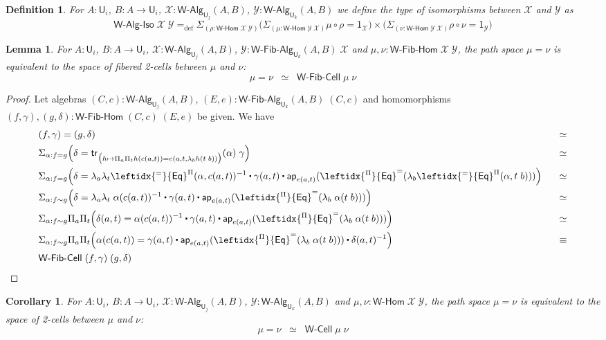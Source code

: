 \documentclass[reqno,10pt,a4paper,oneside]{amsart}
\newcommand{\X}{\mathcal{X}}
\newcommand{\Y}{\mathcal{Y}}
\newcommand{\comp}{\circ}
\newcommand{\prd}[1]{\Pi_{#1}}
\newcommand{\sm}[1]{\Sigma_{#1}}
\newcommand{\lam}[1]{\lambda_{#1}}
\newcommand{\defeq}{=_{\mathrm{def}}}
\newcommand{\funext}{\leftidx{^\Pi}{\mathsf{Eq}}^{=}}
\newcommand{\happly}{\leftidx{^=}{\mathsf{Eq}}^{\Pi}}
\newcommand{\one}{\mathsf{1}}
\newcommand{\UU}{\mathsf{U}}
\newcommand{\WCell}{\mathsf{W}\text{-}\mathsf{Cell}}
\newcommand{\WFibCell}{\mathsf{W}\text{-}\mathsf{Fib}\text{-}\mathsf{Cell}}
\newcommand{\WAlg}{\mathsf{W}\text{-}\mathsf{Alg}}
\newcommand{\WFibAlg}{\mathsf{W}\text{-}\mathsf{Fib}\text{-}\mathsf{Alg}}
\newcommand{\WHom}{\mathsf{W}\text{-}\mathsf{Hom}}
\newcommand{\WFibHom}{\mathsf{W}\text{-}\mathsf{Fib}\text{-}\mathsf{Hom}}
\newcommand{\app}{\mathsf{ap}}
\newcommand{\trans}{\mathsf{tr}}
\newcommand{\WAlgIso}{\mathsf{W}\text{-}\mathsf{Alg}\text{-}\mathsf{Iso}}
\newcommand{\ct}{%
  \mathchoice{\mathbin{\raisebox{0.5ex}{$\displaystyle\centerdot$}}}%
             {\mathbin{\raisebox{0.5ex}{$\centerdot$}}}%
             {\mathbin{\raisebox{0.25ex}{$\scriptstyle\,\centerdot\,$}}}%
             {\mathbin{\raisebox{0.1ex}{$\scriptscriptstyle\,\centerdot\,$}}}}
\numberwithin{equation}{section}
\theoremstyle{mythm}
\newtheorem{lemma}[theorem]{Lemma}
\newtheorem{corollary}[theorem]{Corollary}
\theoremstyle{mydef}
\newtheorem{definition}[theorem]{Definition}
\theoremstyle{myrmk}
\begin{document}
\begin{definition}
For $A:\UU_i$, $B : A \to \UU_i$, $\X : \WAlg_{\UU_j}(A,B)$, $\Y : \WAlg_{\UU_k}(A,B)$ we define the type of \emph{isomorphisms} between $\X$ and $\Y$ as
\[\WAlgIso \; \X \; \Y \defeq \sm{(\rho : \WHom \; \X \; \Y)} \Big(\sm{(\mu : \WHom \; \Y \; \X)} \mu \comp \rho = \one_\X \Big) \times \Big(\sm{(\nu : \WHom \; \Y \; \X)} \rho \comp \nu = \one_\Y \Big) \] 
\end{definition}

\begin{lemma}\label{WFibHomSpace}
For $A:\UU_i$, $B : A \to \UU_i$, $\X : \WAlg_{\UU_j}(A,B)$, $\Y : \WFibAlg_{\UU_k}(A,B) \; \X$ and $\mu,\nu : \WFibHom \; \X \; \Y$, the path space $\mu = \nu$ is equivalent to the space of fibered 2-cells between $\mu$ and $\nu$:
\[ \mu = \nu \;\; \simeq \;\; \WFibCell \; \mu \; \nu \] 
\end{lemma}
\begin{proof}
Let algebras $(C,c) : \WAlg_{\UU_j}(A,B)$, $(E,e) : \WFibAlg_{\UU_k}(A,B) \; (C,c)$ and homomorphisms $(f,\gamma), (g,\delta) : \WFibHom \; (C,c) \; (E,e)$ be given. We have
\begin{alignat*}{4}
& (f,\gamma) = (g,\delta) & \simeq \\
& \sm{\alpha : f = g} \Big(\delta = \trans_{\big(h \mapsto \prd{a}\prd{t} h(c(a,t)) = e(a,t,\lam{b} h(t\;b))\big)}(\alpha) \; \gamma\Big) & \simeq \\
& \sm{\alpha : f = g} \Big(\delta = \lam{a} \lam{t} \happly(\alpha,c(a,t))^{-1} \ct \gamma(a,t) \ct \app_{e(a,t)}(\funext (\lam{b}\happly(\alpha,t \; b))) \Big) & \;\;\; \simeq \\
& \sm{\alpha : f \sim g} \Big(\delta = \lam{a} \lam{t} \; \alpha(c(a,t))^{-1} \ct \gamma(a,t) \ct \app_{e(a,t)}(\funext (\lam{b}\; \alpha(t \; b))) \Big) & \simeq \\
& \sm{\alpha : f \sim g} \prd{a}\prd{t}\Big(\delta(a,t) = \alpha(c(a,t))^{-1} \ct \gamma(a,t) \ct \app_{e(a,t)}(\funext (\lam{b}\; \alpha(t \; b))) \Big) & \simeq \\ 
& \sm{\alpha : f \sim g} \prd{a}\prd{t}\Big(\alpha(c(a,t)) = \gamma(a,t) \ct \app_{e(a,t)}(\funext (\lam{b}\; \alpha(t \; b))) \ct \delta(a,t)^{-1} \Big) & \equiv \\ 
& \WFibCell \; (f,\gamma) \; (g,\delta)
\end{alignat*}
\end{proof}

\begin{corollary}\label{WHomSpace}
For $A:\UU_i$, $B : A \to \UU_i$, $\X : \WAlg_{\UU_j}(A,B)$, $\Y : \WAlg_{\UU_k}(A,B)$ and $\mu,\nu : \WHom \; \X \; \Y$, the path space $\mu = \nu$ is equivalent to the space of 2-cells between $\mu$ and $\nu$:
\[ \mu = \nu \;\; \simeq \;\; \WCell \; \mu \; \nu \] 
\end{corollary}
\end{document}
